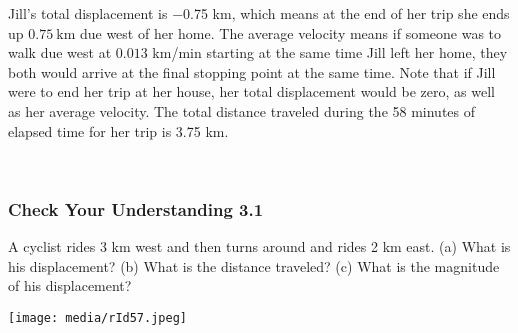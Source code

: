 Jill's total displacement is −0.75 km, which means at the end of her
trip she ends up \(0.75\ \mathrm{\text{km}}\) due west of her home. The
average velocity means if someone was to walk due west at \(0.013\)
km/min starting at the same time Jill left her home, they both would
arrive at the final stopping point at the same time. Note that if Jill
were to end her trip at her house, her total displacement would be zero,
as well as her average velocity. The total distance traveled during the
58 minutes of elapsed time for her trip is 3.75 km.

~

\hypertarget{check-your-understanding-3.1}{%
\subsubsection{Check Your Understanding 3.1
}\label{check-your-understanding-3.1}}

A cyclist rides 3 km west and then turns around and rides 2 km east. (a)
What is his displacement? (b) What is the distance traveled? (c) What is
the magnitude of his displacement?

\texttt{[image: media/rId57.jpeg]}
